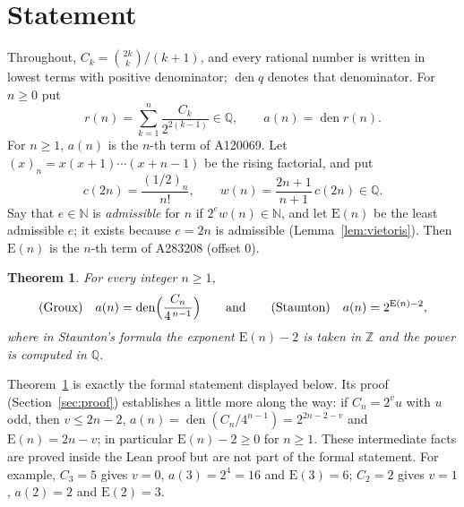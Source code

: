 \documentclass[11pt]{amsart}
\theoremstyle{plain}
\newtheorem{theorem}{Theorem}
\theoremstyle{definition}
\newcommand{\N}{\mathbb{N}}
\newcommand{\Z}{\mathbb{Z}}
\newcommand{\Q}{\mathbb{Q}}
\DeclareMathOperator{\den}{den}
\newcommand{\E}{\mathrm{E}}
\begin{document}
\section{Statement}\label{sec:statement}

Throughout, $C_k=\binom{2k}{k}/(k+1)$, and every rational number is written in lowest terms with positive denominator; $\den q$ denotes that denominator. For $n\ge0$ put
\[
  r(n)=\sum_{k=1}^{n}\frac{C_k}{2^{2(k-1)}}\in\Q,\qquad a(n)=\den r(n).
\]
For $n\ge1$, $a(n)$ is the $n$-th term of A120069. Let $(x)_n=x(x+1)\cdots(x+n-1)$ be the rising factorial, and put
\[
  c(2n)=\frac{(1/2)_n}{n!},\qquad w(n)=\frac{2n+1}{n+1}\,c(2n)\in\Q .
\]
Say that $e\in\N$ is \emph{admissible} for $n$ if $2^{e}w(n)\in\N$, and let $\E(n)$ be the least admissible $e$; it exists because $e=2n$ is admissible (Lemma~\ref{lem:vietoris}). Then $\E(n)$ is the $n$-th term of A283208 (offset $0$).

\begin{theorem}\label{thm:main}
For every integer $n\ge1$,
\[
  \text{(Groux)}\quad a(n)=\den\Bigl(\frac{C_n}{4^{\,n-1}}\Bigr)
  \qquad\text{and}\qquad
  \text{(Staunton)}\quad a(n)=2^{\E(n)-2},
\]
where in Staunton's formula the exponent $\E(n)-2$ is taken in $\Z$ and the power is computed in $\Q$.
\end{theorem}

Theorem~\ref{thm:main} is exactly the formal statement displayed below. Its proof (Section~\ref{sec:proof}) establishes a little more along the way: if $C_n=2^{v}u$ with $u$ odd, then $v\le 2n-2$, $a(n)=\den(C_n/4^{n-1})=2^{2n-2-v}$ and $\E(n)=2n-v$; in particular $\E(n)-2\ge0$ for $n\ge1$. These intermediate facts are proved inside the Lean proof but are not part of the formal statement. For example, $C_3=5$ gives $v=0$, $a(3)=2^4=16$ and $\E(3)=6$; $C_2=2$ gives $v=1$, $a(2)=2$ and $\E(2)=3$.
\end{document}
